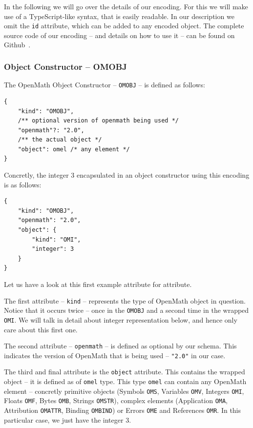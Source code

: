 In the following we will go over the details of our encoding. 
For this we will make use of a TypeScript-like syntax, that is easily readable. 
In our description we omit the \texttt{id} attribute, which can be added to any encoded object. 
The complete source code of our encoding -- and details on how to use it -- can be found on Github~\cite{URL:openmathjson:github}. 

\subsubsection{Object Constructor -- OMOBJ}

The OpenMath Object Constructor -- \texttt{OMOBJ} -- is defined as follows:
\\\begin{minipage}{\linewidth}\begin{lstlisting}
{
    "kind": "OMOBJ",
    /** optional version of openmath being used */
    "openmath"?: "2.0",
    /** the actual object */
    "object": omel /* any element */
}
\end{lstlisting}\end{minipage}
Concretly, the integer 3 encapsulated in an object constructor using this encoding is as follows:
\\\begin{minipage}{\linewidth}\begin{lstlisting}
{
    "kind": "OMOBJ",
    "openmath": "2.0",
    "object": {
        "kind": "OMI", 
        "integer": 3
    }
}
\end{lstlisting}\end{minipage}

Let us have a look at this first example attribute for attribute. 

The first attribute -- \texttt{kind} -- represents the type of OpenMath object in question. 
Notice that it occurs twice -- once in the \texttt{OMOBJ} and a second time in the wrapped \texttt{OMI}. 
We will talk in detail about integer representation below, and hence only care about this first one. 

The second attribute -- \texttt{openmath} -- is defined as optional by our schema. 
This indicates the version of OpenMath that is being used -- \lstinline{"2.0"} in our case. 

The third and final attribute is the \texttt{object} attribute. 
This contains the wrapped object -- it is defined as of \texttt{omel} type. 
This type \texttt{omel} can contain any OpenMath element -- concretly
primitive objects (Symbols \texttt{OMS}, Variables \texttt{OMV}, Integers \texttt{OMI}, Floats \texttt{OMF}, Bytes \texttt{OMB}, Strings \texttt{OMSTR}), 
complex elements (Application \texttt{OMA}, Attribution \texttt{OMATTR}, Binding \texttt{OMBIND}) or
Errors \texttt{OME} and References \texttt{OMR}. 
In this particular case, we just have the integer $3$. 

